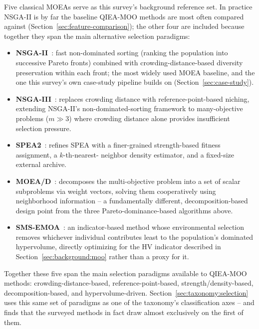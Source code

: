 Five classical MOEAs serve as this survey's background reference set.
In practice NSGA-II is by far the baseline QIEA-MOO methods are most
often compared against (Section~\ref{sec:feature-comparison}); the
other four are included because together they span the main
alternative selection paradigms:
\begin{itemize}
  \item \textbf{NSGA-II}~\citep{deb2002nsga2}: fast non-dominated
    sorting (ranking the population into successive Pareto fronts) combined
    with crowding-distance-based diversity preservation within each
    front; the most widely used MOEA baseline, and the one this survey's
    own case-study pipeline builds on (Section~\ref{sec:case-study}).
  \item \textbf{NSGA-III}~\citep{debjain2014nsga3}: replaces
    crowding distance with reference-point-based niching, extending
    NSGA-II's non-dominated-sorting framework to many-objective problems
    ($m \gg 3$) where crowding distance alone provides insufficient
    selection pressure.
  \item \textbf{SPEA2}~\citep{zitzler2001spea2}: refines SPEA with a
    finer-grained strength-based fitness assignment, a $k$-th-nearest-
    neighbor density estimator, and a fixed-size external archive.
  \item \textbf{MOEA/D}~\citep{zhangli2007moead}: decomposes the
    multi-objective problem into a set of scalar subproblems via weight
    vectors, solving them cooperatively using neighborhood information --
    a fundamentally different, decomposition-based design point from the
    three Pareto-dominance-based algorithms above.
  \item \textbf{SMS-EMOA}~\citep{beume2007smsemoa}: an indicator-based
    method whose environmental selection removes whichever individual
    contributes least to the population's dominated hypervolume, directly
    optimizing for the HV indicator described in
    Section~\ref{sec:background:moo} rather than a proxy for it.
\end{itemize}
Together these five span the main selection paradigms available to
QIEA-MOO methods: crowding-distance-based, reference-point-based,
strength/density-based, decomposition-based, and hypervolume-driven.
Section~\ref{sec:taxonomy:selection} uses this same set of paradigms as
one of the taxonomy's classification axes -- and finds that the surveyed
methods in fact draw almost exclusively on the first of them.

